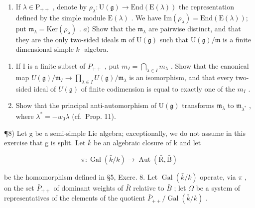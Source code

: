 \begin{enumerate}
\def\labelenumi{\arabic{enumi})}
\setcounter{enumi}{6}
\tightlist
\item
  If \(\lambda \in \mathrm{P}_{++}\) , denote by \(\rho_{\lambda}:\mathrm{U}(\mathfrak{g})\to \mathrm{End}(\mathrm{E}(\lambda))\) the representation defined by the simple module \(\mathrm{E}(\lambda)\) . We have \(\mathrm{Im}(\rho_{\lambda}) = \mathrm{End}(\mathrm{E}(\lambda));\) put \(\mathfrak{m}_{\lambda} = \mathrm{Ker}(\rho_{\lambda})\) . \(a)\) Show that the \(\mathfrak{m}_{\lambda}\) are pairwise distinct, and that they are the only two-sided ideals \(\mathfrak{m}\) of \(\mathrm{U}(\mathfrak{g})\) such that \(\mathrm{U}(\mathfrak{g}) / \mathfrak{m}\) is a finite dimensional simple \(k\) -algebra.
\end{enumerate}

\begin{enumerate}
\def\labelenumi{\alph{enumi})}
\setcounter{enumi}{1}
\item
  If I is a finite subset of \(P_{++}\) , put \(m_{I} = \bigcap_{\lambda \in I} m_{\lambda}\) . Show that the canonical map \(U(\mathfrak{g}) / \mathfrak{m}_{I} \to \prod_{\lambda \in I} U(\mathfrak{g}) / \mathfrak{m}_{\lambda}\) is an isomorphism, and that every two-sided ideal of \(U(\mathfrak{g})\) of finite codimension is equal to exactly one of the \(m_{I}\) .
\item
  Show that the principal anti-automorphism of \(\mathrm{U}(\mathfrak{g})\) transforms \(\mathfrak{m}_{\lambda}\) to \(\mathfrak{m}_{\lambda^*}\) , where \(\lambda^{*} = -w_{0}\lambda\) (cf.~Prop. 11).
\end{enumerate}

¶8) Let g be a semi-simple Lie algebra; exceptionally, we do not assume in this exercise that g is split. Let \(\bar{k}\) be an algebraic closure of k and let

\[
\pi : \operatorname{Gal} (\bar {k} / k) \to \operatorname{Aut} (\bar {\mathrm{R}}, \bar {\mathrm{B}})
\]

be the homomorphism defined in §5, Exerc. 8. Let \(\operatorname{Gal}(\bar{k}/k)\) operate, via \(\pi\) , on the set \(\bar{P}_{++}\) of dominant weights of \(\bar{R}\) relative to \(\bar{B}\) ; let \(\Omega\) be a system of representatives of the elements of the quotient \(\bar{P}_{++}/\operatorname{Gal}(\bar{k}/k)\) .


